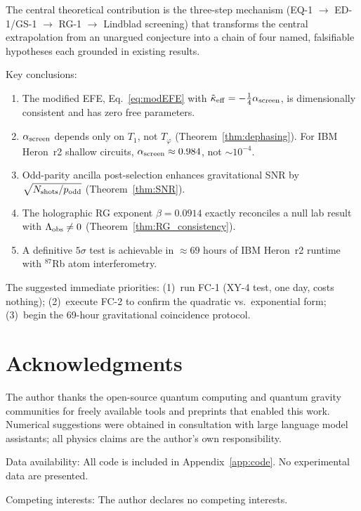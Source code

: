 \documentclass[12pt]{article}
\begin{document}
The central theoretical contribution is the three-step mechanism
(EQ-1 $\to$ ED-1/GS-1 $\to$ RG-1 $\to$ Lindblad screening) that transforms the central
extrapolation from an unargued conjecture into a chain of four named, falsifiable
hypotheses each grounded in existing results.

Key conclusions:
\begin{enumerate}
\item The modified EFE, Eq.~\eqref{eq:modEFE} with $\tilde{\kappa}_{\rm eff} = -\tfrac{1}{4}\alpha_{\rm screen}$,
is dimensionally consistent and has zero free parameters.
\item $\alpha_{\rm screen}$ depends only on $T_1$, not $T_\varphi$ (Theorem~\ref{thm:dephasing}).
For IBM Heron~r2 shallow circuits, $\alpha_{\rm screen}\approx 0.984$, not $\sim 10^{-4}$.
\item Odd-parity ancilla post-selection enhances gravitational SNR by $\sqrt{N_{\rm shots}/p_{\rm odd}}$
(Theorem~\ref{thm:SNR}).
\item The holographic RG exponent $\beta = 0.0914$ exactly reconciles a null lab result
with $\Lambda_{\rm obs}\ne 0$ (Theorem~\ref{thm:RG_consistency}).
\item A definitive $5\sigma$ test is achievable in $\approx 69$ hours of IBM Heron~r2 runtime
with $^{87}$Rb atom interferometry.
\end{enumerate}

The suggested immediate priorities: (1)~run FC-1 (XY-4 test, one day, costs nothing);
(2)~execute FC-2 to confirm the quadratic vs.\ exponential form; (3)~begin the 69-hour
gravitational coincidence protocol.

\section*{Acknowledgments}

The author thanks the open-source quantum computing and quantum gravity communities
for freely available tools and preprints that enabled this work. Numerical suggestions
were obtained in consultation with large language model assistants; all physics claims
are the author's own responsibility.

Data availability: All code is included in Appendix~\ref{app:code}. No experimental
data are presented.

Competing interests: The author declares no competing interests.
\end{document}
